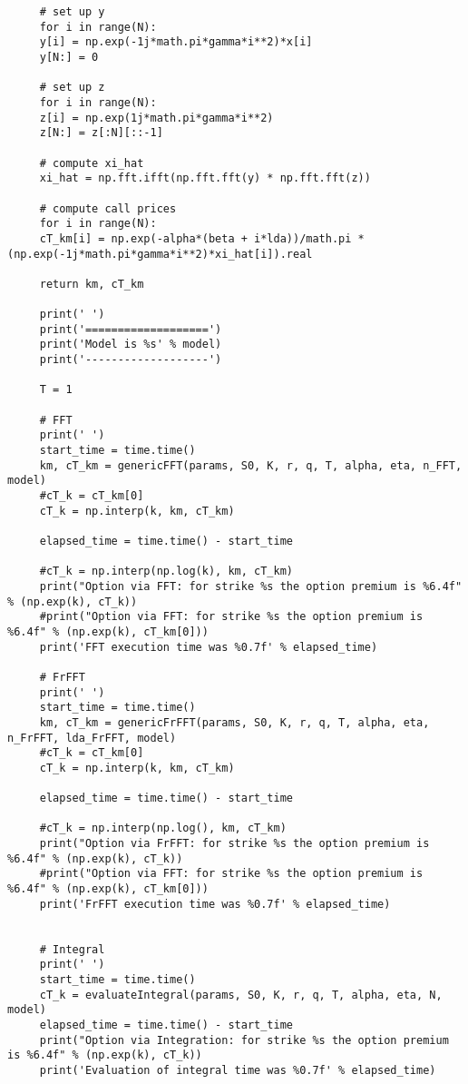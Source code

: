 \documentclass[letterpaper]{article}
\begin{document}
\begin{lstlisting}
     # set up y
     for i in range(N):
     y[i] = np.exp(-1j*math.pi*gamma*i**2)*x[i]
     y[N:] = 0
     
     # set up z
     for i in range(N):
     z[i] = np.exp(1j*math.pi*gamma*i**2)
     z[N:] = z[:N][::-1]
     
     # compute xi_hat
     xi_hat = np.fft.ifft(np.fft.fft(y) * np.fft.fft(z))
     
     # compute call prices
     for i in range(N):
     cT_km[i] = np.exp(-alpha*(beta + i*lda))/math.pi * (np.exp(-1j*math.pi*gamma*i**2)*xi_hat[i]).real
     
     return km, cT_km
     
     print(' ')
     print('===================')
     print('Model is %s' % model)
     print('-------------------')
     
     T = 1
     
     # FFT
     print(' ')
     start_time = time.time()
     km, cT_km = genericFFT(params, S0, K, r, q, T, alpha, eta, n_FFT, model)
     #cT_k = cT_km[0]
     cT_k = np.interp(k, km, cT_km)
     
     elapsed_time = time.time() - start_time
     
     #cT_k = np.interp(np.log(k), km, cT_km)
     print("Option via FFT: for strike %s the option premium is %6.4f" % (np.exp(k), cT_k))
     #print("Option via FFT: for strike %s the option premium is %6.4f" % (np.exp(k), cT_km[0]))
     print('FFT execution time was %0.7f' % elapsed_time)
     
     # FrFFT
     print(' ')
     start_time = time.time()
     km, cT_km = genericFrFFT(params, S0, K, r, q, T, alpha, eta, n_FrFFT, lda_FrFFT, model)
     #cT_k = cT_km[0]
     cT_k = np.interp(k, km, cT_km)
     
     elapsed_time = time.time() - start_time
     
     #cT_k = np.interp(np.log(), km, cT_km)
     print("Option via FrFFT: for strike %s the option premium is %6.4f" % (np.exp(k), cT_k))
     #print("Option via FFT: for strike %s the option premium is %6.4f" % (np.exp(k), cT_km[0]))
     print('FrFFT execution time was %0.7f' % elapsed_time)
     
     
     # Integral
     print(' ')
     start_time = time.time()
     cT_k = evaluateIntegral(params, S0, K, r, q, T, alpha, eta, N, model)
     elapsed_time = time.time() - start_time
     print("Option via Integration: for strike %s the option premium is %6.4f" % (np.exp(k), cT_k))
     print('Evaluation of integral time was %0.7f' % elapsed_time)
	 	
	 \end{lstlisting}
 
\end{document}
